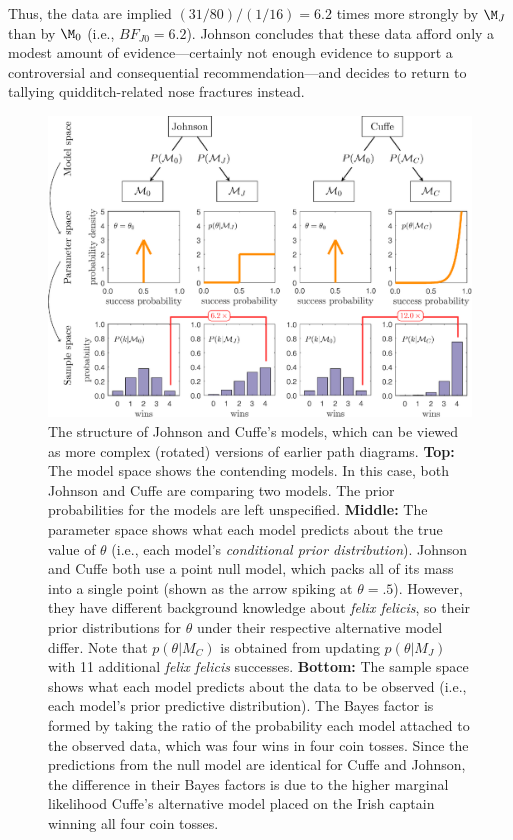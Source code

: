 Thus, the data are implied $\left(31/80\right) / \left(1/16\right) = 6.2$ times more strongly by $\M_J$ than by $\M_0$ (i.e., $BF_{J0}=6.2$).  Johnson concludes that these data afford only a modest amount of evidence---certainly not enough evidence to support a controversial and consequential recommendation---and decides to return to tallying quidditch-related nose fractures instead.

\begin{figure}[p] 
\begin{center}
\includegraphics[width=\textwidth%
]{figs/bi0_etzvandekerckhove_fig7} \vspace{1ex}
\caption{The structure of Johnson and Cuffe's models, which can be viewed as more complex (rotated) versions of earlier path diagrams. \textbf{Top:} The model space shows the contending models. In this case, both Johnson and Cuffe are comparing two models. The prior probabilities for the models are left unspecified. \textbf{Middle:} The parameter space shows what each model predicts about the true value of $\theta$ (i.e., each model's \textit{conditional prior distribution}). Johnson and Cuffe both use a point null model, which packs all of its mass into a single point (shown as the arrow spiking at $\theta=.5$). However, they have different background knowledge about \textit{felix felicis}, so their prior distributions for $\theta$ under their respective alternative model differ. Note that $p(\theta|M_C)$ is obtained from updating $p(\theta|M_J)$ with 11 additional \emph{felix felicis} successes. \textbf{Bottom:} The sample space shows what each model predicts about the data to be observed (i.e., each model's prior predictive distribution). The Bayes factor is formed by taking the ratio of the probability each model attached to the observed data, which was four wins in four coin tosses. Since the predictions from the null model are identical for Cuffe and Johnson, the difference in their Bayes factors is due to the higher marginal likelihood Cuffe's alternative model placed on the Irish captain winning all four coin tosses.}
\label{fig:bi0:hier}
\end{center}
\end{figure} 



